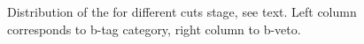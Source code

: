\begin{figure}[p]
     	

    \caption{\footnotesize Distribution of the \mmc for different cuts stage, see text. Left column corresponds to b-tag category, right column to b-veto.}
   \label{fig:mass}
\end{figure}


